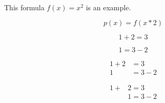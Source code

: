 \documentclass{article}
\begin{document}
\paragraph{}
This formula $f(x) = x ^ 2$ is an example.

\begin{equation*}
	p(x) = f(x*2)
\end{equation*}

\begin{equation*}
	1 + 2 = 3
\end{equation*}

\begin{equation*}
	1 = 3 - 2
\end{equation*}

\begin{align*}
	1 + 2 &= 3 \\
	1 &= 3 - 2
\end{align*}

\begin{align*}
	1 +  &2 = 3 \\
	&1 = 3 - 2
\end{align*}
\end{document}
